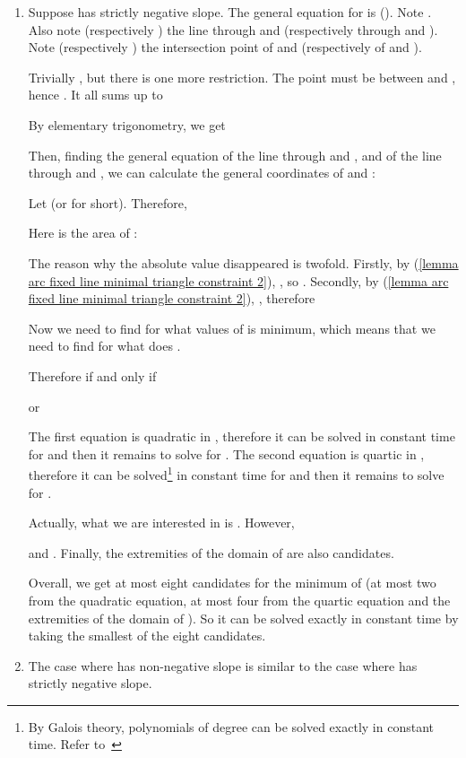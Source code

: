 \documentclass[11pt, oneside]{article}
\begin{document}
\begin{enumerate}
\item[(1)] Suppose  has strictly negative slope.
The general equation for  is  ().
Note .
Also note  
(respectively )
the line through  and 
(respectively through  and ).
Note  
(respectively )
the intersection point of  and 
(respectively of  and ).

Trivially ,
but there is one more restriction.
The point  must be between  and ,
hence .
It all sums up to


By elementary trigonometry,
we get

Then,
finding the general equation of the line through  and ,
and of the line through  and ,
we can calculate the general coordinates of  and :

Let 
(or  for short).
Therefore,

Here is the area  of :

The reason why the absolute value  disappeared
is twofold.
Firstly,
by (\ref{lemma arc fixed line minimal triangle constraint 2}),
,
so .
Secondly,
by (\ref{lemma arc fixed line minimal triangle constraint 2}),
,
therefore



Now we need to find for what values
of  is  minimum,
which means that we need to find for what 
does .

Therefore  if and only if

or

The first equation is quadratic in ,
therefore it can be solved in constant time for 
and then it remains to solve for .
The second equation is quartic in ,
therefore it can be solved\footnote{By Galois theory,
polynomials of degree  can be solved exactly in constant time.
Refer to~\cite{dummit}} 
in constant time for 
and then it remains to solve for .

Actually,
what we are interested in is .
However,

and .
Finally,
the extremities of the domain of 
are also candidates.

Overall, 
we get at most eight candidates for the minimum of 
(at most two from the quadratic equation, 
at most four from the quartic equation
and the extremities of the domain of ).
So it can be solved exactly in constant time 
by taking the smallest of the eight candidates.

\item[(2)] The case where  has non-negative slope
is similar to the case where  has strictly negative slope.


\end{enumerate}
\end{document}
